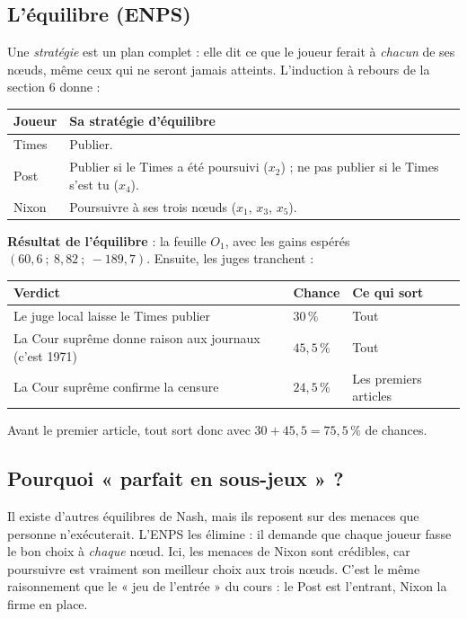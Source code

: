 \documentclass[11pt,a4paper]{article}
\theoremstyle{definition}
\begin{document}
\subsection{L'équilibre (ENPS)}
Une \emph{stratégie} est un plan complet : elle dit ce que le joueur ferait à \emph{chacun} de ses nœuds, même ceux qui ne seront jamais atteints. L'induction à rebours de la section 6 donne :
\begin{center}
\small
\begin{tabular}{@{}ll@{}}
\toprule
Joueur & Sa stratégie d'équilibre \\
\midrule
Times & Publier. \\
Post & Publier si le Times a été poursuivi ($x_2$) ; ne pas publier si le Times s'est tu ($x_4$). \\
Nixon & Poursuivre à ses trois nœuds ($x_1$, $x_3$, $x_5$). \\
\bottomrule
\end{tabular}
\end{center}
\textbf{Résultat de l'équilibre} : la feuille $O_1$, avec les gains espérés $(60,6\ ;\ 8,82\ ;\ -189,7)$. Ensuite, les juges tranchent :
\begin{center}
\small
\begin{tabular}{@{}lll@{}}
\toprule
Verdict & Chance & Ce qui sort \\
\midrule
Le juge local laisse le Times publier & $30\,\%$ & Tout \\
La Cour suprême donne raison aux journaux (c'est 1971) & $45,5\,\%$ & Tout \\
La Cour suprême confirme la censure & $24,5\,\%$ & Les premiers articles \\
\bottomrule
\end{tabular}
\end{center}
Avant le premier article, tout sort donc avec $30+45,5=75,5\,\%$ de chances.

\subsection{Pourquoi « parfait en sous-jeux » ?}
Il existe d'autres équilibres de Nash, mais ils reposent sur des menaces que personne n'exécuterait. L'ENPS les élimine : il demande que chaque joueur fasse le bon choix à \emph{chaque} nœud. Ici, les menaces de Nixon sont crédibles, car poursuivre est vraiment son meilleur choix aux trois nœuds. C'est le même raisonnement que le « jeu de l'entrée » du cours : le Post est l'entrant, Nixon la firme en place.
\end{document}
